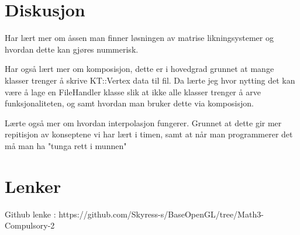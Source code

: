 ﻿\documentclass[14]{article}
\begin{document}
\begin{flushleft}
        \section{Diskusjon}
        Har lært mer om åssen man finner løsningen av matrise likningsystemer og hvordan dette kan gjøres nummerisk.
        
        
        Har også lært mer om komposisjon, dette er i hovedgrad grunnet at mange klasser trenger å skrive KT::Vertex
        data til fil. Da lærte jeg hvor nytting det kan være å lage en FileHandler klasse slik at ikke alle klasser trenger 
        å arve funksjonaliteten, og samt hvordan man bruker dette via komposisjon.
        
        Lærte også mer om hvordan interpolasjon fungerer. Grunnet at dette gir mer repitisjon av konseptene vi har lært i timen,
        samt at når man programmerer det må man ha "tunga rett i munnen"
       
        \section{Lenker}
        Github lenke : https://github.com/Skyress-s/BaseOpenGL/tree/Math3-Compulsory-2
    \end{flushleft}
\end{document}

